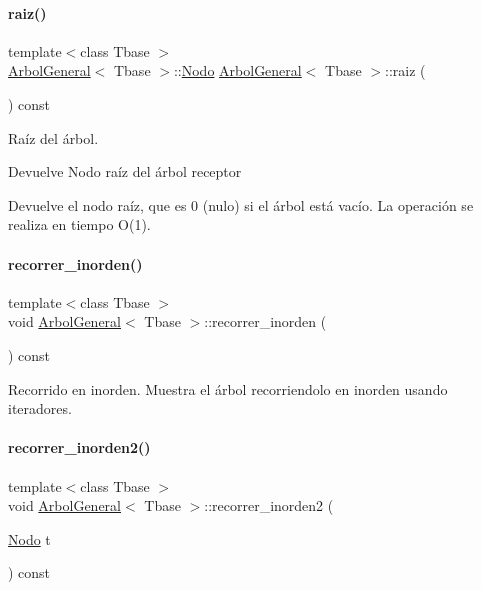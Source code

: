 \paragraph{\texorpdfstring{raiz()}{raiz()}}
{\footnotesize\ttfamily template$<$class Tbase $>$ \\
\hyperlink{classArbolGeneral}{Arbol\+General}$<$ Tbase $>$\+::\hyperlink{classArbolGeneral_a12cc1b74a9095d89bc7334290d332f7a}{Nodo} \hyperlink{classArbolGeneral}{Arbol\+General}$<$ Tbase $>$\+::raiz (\begin{DoxyParamCaption}{ }\end{DoxyParamCaption}) const}



Raíz del árbol. 

\begin{DoxyReturn}{Devuelve}
Nodo raíz del árbol receptor
\end{DoxyReturn}
Devuelve el nodo raíz, que es 0 (nulo) si el árbol está vacío. La operación se realiza en tiempo O(1). \hypertarget{classArbolGeneral_a2ef9f4a8e55d88e21eb6e9c41dda934f}{}\label{classArbolGeneral_a2ef9f4a8e55d88e21eb6e9c41dda934f} 
\paragraph{\texorpdfstring{recorrer\+\_\+inorden()}{recorrer\_inorden()}}
{\footnotesize\ttfamily template$<$class Tbase $>$ \\
void \hyperlink{classArbolGeneral}{Arbol\+General}$<$ Tbase $>$\+::recorrer\+\_\+inorden (\begin{DoxyParamCaption}{ }\end{DoxyParamCaption}) const}



Recorrido en inorden.  Muestra el árbol recorriendolo en inorden usando iteradores. 

\hypertarget{classArbolGeneral_acaf0169d0b147e0727d28c09edc62e28}{}\label{classArbolGeneral_acaf0169d0b147e0727d28c09edc62e28} 
\paragraph{\texorpdfstring{recorrer\+\_\+inorden2()}{recorrer\_inorden2()}}
{\footnotesize\ttfamily template$<$class Tbase $>$ \\
void \hyperlink{classArbolGeneral}{Arbol\+General}$<$ Tbase $>$\+::recorrer\+\_\+inorden2 (\begin{DoxyParamCaption}\item[{\hyperlink{classArbolGeneral_a12cc1b74a9095d89bc7334290d332f7a}{Nodo}}]{t }\end{DoxyParamCaption}) const}



